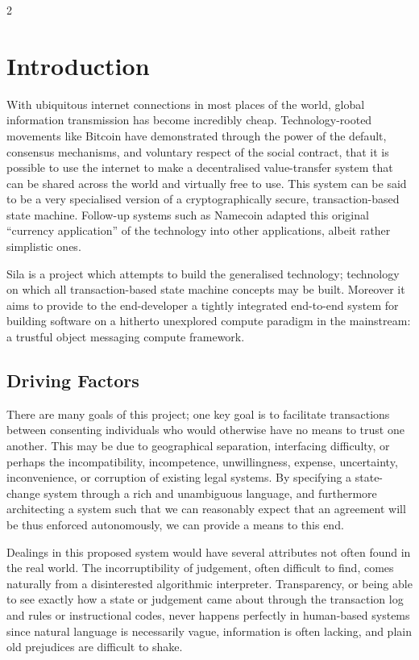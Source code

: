 \documentclass[9pt,oneside]{amsart}
\begin{document}
\setlength{\columnsep}{20pt}
\begin{multicols}{2}

\section{Introduction}\label{sec:introduction}

With ubiquitous internet connections in most places of the world, global information transmission has become incredibly cheap. Technology-rooted movements like Bitcoin have demonstrated through the power of the default, consensus mechanisms, and voluntary respect of the social contract, that it is possible to use the internet to make a decentralised value-transfer system that can be shared across the world and virtually free to use. This system can be said to be a very specialised version of a cryptographically secure, transaction-based state machine. Follow-up systems such as Namecoin adapted this original ``currency application'' of the technology into other applications, albeit rather simplistic ones.

Sila is a project which attempts to build the generalised technology; technology on which all transaction-based state machine concepts may be built. Moreover it aims to provide to the end-developer a tightly integrated end-to-end system for building software on a hitherto unexplored compute paradigm in the mainstream: a trustful object messaging compute framework.

\subsection{Driving Factors} \label{ch:driving}

There are many goals of this project; one key goal is to facilitate transactions between consenting individuals who would otherwise have no means to trust one another. This may be due to geographical separation, interfacing difficulty, or perhaps the incompatibility, incompetence, unwillingness, expense, uncertainty, inconvenience, or corruption of existing legal systems. By specifying a state-change system through a rich and unambiguous language, and furthermore architecting a system such that we can reasonably expect that an agreement will be thus enforced autonomously, we can provide a means to this end.

Dealings in this proposed system would have several attributes not often found in the real world. The incorruptibility of judgement, often difficult to find, comes naturally from a disinterested algorithmic interpreter. Transparency, or being able to see exactly how a state or judgement came about through the transaction log and rules or instructional codes, never happens perfectly in human-based systems since natural language is necessarily vague, information is often lacking, and plain old prejudices are difficult to shake.


\end{multicols}
\end{document}

